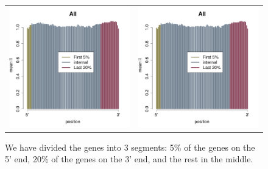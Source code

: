 \documentclass[12pt,letterpaper]{article}
\begin{document}
\begin{figure}
\begin{tabular}{c c}
\includegraphics[scale=0.4, page=3]{insertion-position-bias.pdf}&
\includegraphics[scale=0.4, page=4]{insertion-position-bias.pdf}
\end{tabular}
\caption{We have divided the genes into 3 segments: 5\% of
the genes on the 5' end, 20\% of the genes on the 3' end, and the rest in the middle.}
\label{fig:insertion-position-bias}
\end{figure}
\end{document}
